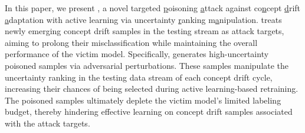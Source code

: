In this paper, we present \pandora, a novel targeted \underline{p}oisoning \underline{a}ttack against co\underline{n}cept \underline{d}rift \underline{a}daptation with active learning via uncertainty \underline{r}anking m\underline{a}nipulation.
\pandora treats newly emerging concept drift samples in the testing stream as attack targets, aiming to prolong their misclassification while maintaining the overall performance of the victim model.
Specifically, \pandora generates high-uncertainty poisoned samples via adversarial perturbations.
These samples manipulate the uncertainty ranking in the testing data stream of each concept drift cycle, increasing their chances of being selected during active learning-based retraining.
The poisoned samples ultimately deplete the victim model’s limited labeling budget, thereby hindering effective learning on concept drift samples associated with the attack targets.


